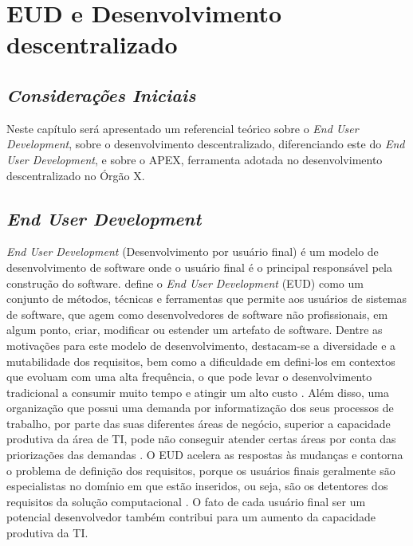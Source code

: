 \chapter[EUD e Desenvolvimento descentralizado]{EUD e Desenvolvimento descentralizado}

\section{\textit{Considerações Iniciais}}

Neste capítulo será apresentado um referencial teórico sobre o \textit{End User Development}, sobre o desenvolvimento descentralizado, diferenciando este do \textit{End User Development}, e sobre o APEX, ferramenta adotada no desenvolvimento descentralizado no Órgão X.

\section{\textit{End User Development}}

\textit{End User Development} (Desenvolvimento por usuário final) é um modelo de desenvolvimento de software onde o usuário final é o principal responsável pela construção do software.  define o \textit{End User Development} (EUD) como um conjunto de métodos, técnicas e ferramentas que permite aos usuários de sistemas de software, que agem como desenvolvedores de software não profissionais, em algum ponto, criar, modificar ou estender um artefato de software. Dentre as motivações para este modelo de desenvolvimento, destacam-se a diversidade e a mutabilidade dos requisitos, bem como a dificuldade em defini-los em contextos que evoluam com uma alta frequência, o que pode levar o desenvolvimento tradicional a consumir muito tempo e atingir um alto custo \cite{lieberman2006}. Além disso, uma organização que possui uma demanda por informatização dos seus processos de trabalho, por parte das suas diferentes áreas de negócio, superior a capacidade produtiva da área de TI, pode não conseguir atender certas áreas por conta das priorizações das demandas \cite{artigoTcuGovTI}. O EUD acelera as respostas às mudanças e contorna o problema de definição dos requisitos, porque os usuários finais geralmente são especialistas no domínio em que estão inseridos, ou seja, são os detentores dos requisitos da solução computacional \cite{fischer2004}. O fato de cada usuário final ser um potencial desenvolvedor também contribui para um aumento da capacidade produtiva da TI.

